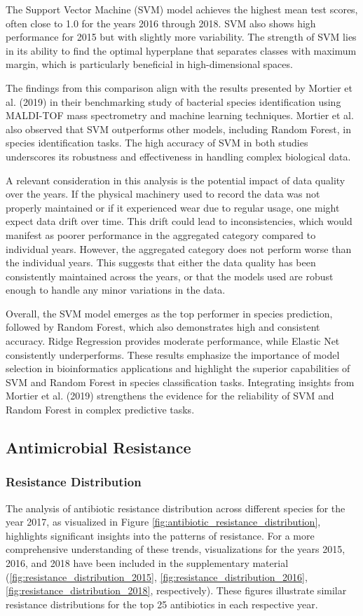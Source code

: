 \documentclass[english,11pt,a4paper,titlepage]{article}
\begin{document}
The Support Vector Machine (SVM) model achieves the highest mean test scores, often close to 1.0 for the years 2016 through 2018. SVM also shows high performance for 2015 but with slightly more variability. The strength of SVM lies in its ability to find the optimal hyperplane that separates classes with maximum margin, which is particularly beneficial in high-dimensional spaces. 

The findings from this comparison align with the results presented by Mortier et al. (2019) \cite{mortierBacterialSpeciesIdentification2021} in their benchmarking study of bacterial species identification using MALDI-TOF mass spectrometry and machine learning techniques. Mortier et al. also observed that SVM outperforms other models, including Random Forest, in species identification tasks. The high accuracy of SVM in both studies underscores its robustness and effectiveness in handling complex biological data.

A relevant consideration in this analysis is the potential impact of data quality over the years. If the physical machinery used to record the data was not properly maintained or if it experienced wear due to regular usage, one might expect data drift over time. This drift could lead to inconsistencies, which would manifest as poorer performance in the aggregated category compared to individual years. However, the aggregated category does not perform worse than the individual years. This suggests that either the data quality has been consistently maintained across the years, or that the models used are robust enough to handle any minor variations in the data.

Overall, the SVM model emerges as the top performer in species prediction, followed by Random Forest, which also demonstrates high and consistent accuracy. Ridge Regression provides moderate performance, while Elastic Net consistently underperforms. These results emphasize the importance of model selection in bioinformatics applications and highlight the superior capabilities of SVM and Random Forest in species classification tasks. Integrating insights from Mortier et al. (2019) strengthens the evidence for the reliability of SVM and Random Forest in complex predictive tasks.

\subsection*{Antimicrobial Resistance}
\subsubsection*{Resistance Distribution}
The analysis of antibiotic resistance distribution across different species for the year 2017, as visualized in Figure \ref{fig:antibiotic_resistance_distribution}, highlights significant insights into the patterns of resistance. For a more comprehensive understanding of these trends, visualizations for the years 2015, 2016, and 2018 have been included in the supplementary material (\ref{fig:resistance_distribution_2015}, \ref{fig:resistance_distribution_2016}, \ref{fig:resistance_distribution_2018}, respectively). These figures illustrate similar resistance distributions for the top 25 antibiotics in each respective year.
\end{document}

